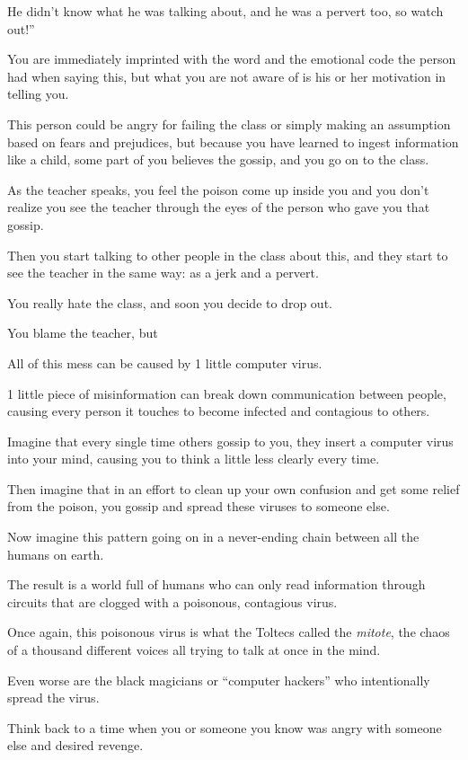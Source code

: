 \documentclass{article}
\numberwithin{equation}{section}
\begin{document}
He didn't know what he was talking about, and he was a pervert too, so watch out!''

%
You are immediately imprinted with the word and the emotional code the person had when saying this, but what you are not aware of is his or her motivation in telling you.

This person could be angry for failing the class or simply making an assumption based on fears and prejudices, but because you have learned to ingest information like a child, some part of you believes the gossip, and you go on to the class.

As the teacher speaks, you feel the poison come up inside you and you don't realize you see the teacher through the eyes of the person who gave you that gossip.

Then you start talking to other people in the class about this, and they start to see the teacher in the same way: as a jerk and a pervert.

You really hate the class, and soon you decide to drop out.

You blame the teacher, but 

%
All of this mess can be caused by 1 little computer virus.

1 little piece of misinformation can break down communication between people, causing every person it touches to become infected and contagious to others.

Imagine that every single time others gossip to you, they insert a computer virus into your mind, causing you to think a little less clearly every time.

Then imagine that in an effort to clean up your own confusion and get some relief from the poison, you gossip and spread these viruses to someone else.

%
Now imagine this pattern going on in a never-ending chain between all the humans on earth.

The result is a world full of humans who can only read information through circuits that are clogged with a poisonous, contagious virus.

Once again, this poisonous virus is what the Toltecs called the \textit{mitote}, the chaos of a thousand different voices all trying to talk at once in the mind.

%
Even worse are the black magicians or ``computer hackers'' who intentionally spread the virus.

Think back to a time when you or someone you know was angry with someone else and desired revenge.
\end{document}

